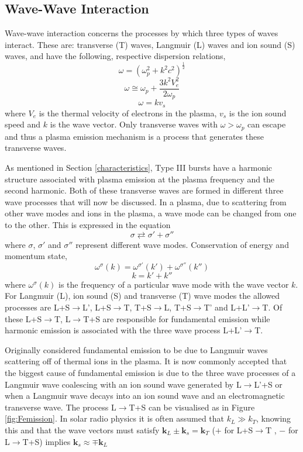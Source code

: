 \subsection{Wave-Wave Interaction}\label{Plasma Emission}
Wave-wave interaction concerns the processes by which three types of waves interact. These are: transverse (T) waves, Langmuir (L) waves and ion sound (S) waves, and have the following, respective dispersion relations,
$$ \omega=(\omega_p^2 +k^2c^2)^{\frac{1}{2}} $$
$$ \omega \cong \omega_p + \frac{3k^2V_e^2}{2 \omega_p}$$
$$ \omega = kv_s $$
where $V_e$ is the thermal velocity of electrons in the plasma, $v_s$ is the ion sound speed and $k$ is the wave vector. Only transverse waves with $\omega > \omega_p $ can escape and thus a plasma emission mechanism is a process that generates these transverse waves. 

As mentioned in Section \ref{characteristics}, Type III bursts have a harmonic structure associated with plasma emission at the plasma frequency and the second harmonic. Both of these transverse waves are formed in different three wave processes that will now be discussed.
In a plasma, due to scattering from other wave modes and ions in the plasma, a wave mode can be changed from one to the other. This is expressed in the equation 
$$ \sigma \rightleftarrows \sigma' + \sigma '' $$
where $\sigma$, $\sigma'$  and  $\sigma ''$ represent different wave modes. Conservation of energy and momentum state,
$$ \omega^{\sigma}(k)=\omega^{\sigma'}(k')+\omega^{\sigma''}(k'')$$
$$ k=k'+k''$$
where $ \omega^{\sigma}(k)$ is the frequency of a particular wave mode with the wave vector $k$. For Langmuir (L), ion sound (S) and transverse (T) wave modes the allowed processes are L+S$\rightarrow$L', L+S$\rightarrow$T,  T+S$\rightarrow$L,  T+S$\rightarrow$T' and  L+L'$\rightarrow$T. Of these L+S$\rightarrow$T,  L$\rightarrow$T+S are responsible for fundamental emission while harmonic emission is associated with the three wave process L+L'$\rightarrow$T.

Originally \cite{Ginzburg1958} considered fundamental emission to be due to Langmuir waves scattering off of thermal ions in the plasma. It is now commonly accepted that the biggest cause of fundamental emission is due to the three wave processes of a Langmuir wave coalescing with an ion sound wave generated by L$\rightarrow$L'+S or when a Langmuir wave decays into an ion sound wave and an electromagnetic transverse wave. The process L$\rightarrow$T+S can be visualised as in Figure \ref{fig:Femission}. In solar radio physics it is often assumed that $k_L \gg k_T$, knowing this and that the wave vectors must satisfy $\mathbf{k}_L \pm \mathbf{k}_s = \mathbf{k}_T$ ($+$ for L+S$\rightarrow$T , $-$ for L$\rightarrow$T+S) implies $\mathbf{k}_s \approx \mp \mathbf{k}_L$ 


